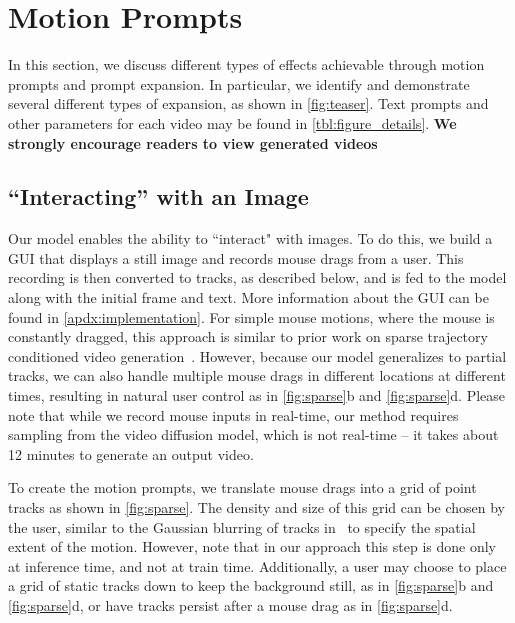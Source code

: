\section{Motion Prompts}
\label{sec:motionprompting}

In this section, we discuss different types of effects achievable through motion prompts and prompt expansion. In particular, we identify and demonstrate several different types of expansion, as shown in \cref{fig:teaser}. Text prompts and other parameters for each video may be found in \cref{tbl:figure_details}. \textbf{We strongly encourage readers to view generated videos }

\subsection{``Interacting'' with an Image} 
\label{sec:interacting}




Our model enables the ability to ``interact" with images. To do this, we build a GUI that displays a still image and records mouse drags from a user.
This recording is then converted to tracks, as described below, and is fed to the model along with the initial frame and text.
More information about the GUI can be found in \cref{apdx:implementation}.
For simple mouse motions, where the mouse is constantly dragged, this approach is similar to prior work on sparse trajectory conditioned video generation~\cite{wang2024motionctrl,yin2023dragnuwa,li2024image,wu2024draganything,niu2024mofa,2023videocomposer,shi2024motion,zhang2024tora,zhou2024trackgo,namekata2024sg}.
However, because our model generalizes to partial tracks, we can also handle multiple mouse drags in different locations at different times, resulting in natural user control as in \cref{fig:sparse}b and \cref{fig:sparse}d.
Please note that while we record mouse inputs in real-time, our method requires sampling from the video diffusion model, which is not real-time -- it takes about 12 minutes to generate an output video. 

To create the motion prompts, we translate mouse drags into a grid of point tracks as shown in \cref{fig:sparse}. 
The density and size of this grid can be chosen by the user, similar to the Gaussian blurring of tracks in~\cite{yin2023dragnuwa,wang2024motionctrl,wu2024draganything,li2024image} to specify the spatial extent of the motion.
However, note that in our approach this step is done only at inference time, and not at train time.
Additionally, a user may choose to place a grid of static tracks down to keep the background still, as in \cref{fig:sparse}b and \cref{fig:sparse}d, or have tracks persist after a mouse drag as in \cref{fig:sparse}d.






